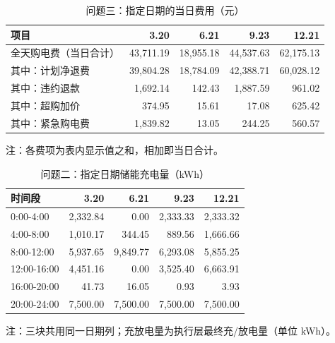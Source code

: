 \begin{table}[htbp]
\centering
\caption{问题三：指定日期的当日费用（元）}
\label{tab:q3-a2}
\small
\setlength{\tabcolsep}{4pt}
\begin{tabular}{lrrrr}
\toprule
项目 & 3.20 & 6.21 & 9.23 & 12.21 \\
\midrule
全天购电费（当日合计） & 43,711.19 & 18,955.18 & 44,537.63 & 62,175.13 \\
其中：计划净退费 & 39,804.28 & 18,784.09 & 42,388.71 & 60,028.12 \\
其中：违约退款 & 1,692.14 & 142.43 & 1,887.59 & 961.02 \\
其中：超购加价 & 374.95 & 15.61 & 17.08 & 625.42 \\
其中：紧急购电费 & 1,839.82 & 13.05 & 244.25 & 560.57 \\
\bottomrule
\end{tabular}
\vspace{2pt}
\begin{flushleft}\footnotesize 注：各费项为表内显示值之和，相加即当日合计。\end{flushleft}
\end{table}
\begin{table}[htbp]
\centering
\caption{问题二：指定日期储能充电量（kWh）}
\label{tab:q2-b1}
\small
\setlength{\tabcolsep}{4pt}
\begin{tabular}{lrrrr}
\toprule
时间段 & 3.20 & 6.21 & 9.23 & 12.21 \\
\midrule
0:00-4:00 & 2,332.84 & 0.00 & 2,333.33 & 2,333.32 \\
4:00-8:00 & 1,010.17 & 344.45 & 889.56 & 1,666.66 \\
8:00-12:00 & 5,937.65 & 9,849.77 & 6,293.08 & 5,855.25 \\
12:00-16:00 & 4,451.16 & 0.00 & 3,525.40 & 6,663.91 \\
16:00-20:00 & 41.73 & 16.05 & 0.93 & 3.93 \\
20:00-24:00 & 7,500.00 & 7,500.00 & 7,500.00 & 7,500.00 \\
\bottomrule
\end{tabular}
\vspace{2pt}
\begin{flushleft}\footnotesize 注：三块共用同一日期列；充放电量为执行层最终充/放电量（单位 kWh）。\end{flushleft}
\end{table}
